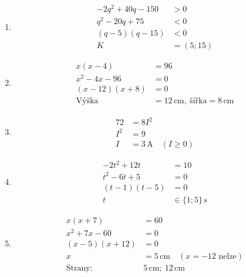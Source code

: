 \documentclass[11pt,a4paper]{article}
\begin{document}
\begin{zadaniReseniBox}[title={Domácí úkol}]
\begin{enumerate}[label=\alph*),itemsep=2pt]
\[\begin{aligned}
v&=20\,\mathrm{m/s}\quad(v\ge0)
\end{aligned}\]
\item
\[\begin{aligned}
-2q^2+40q-150&>0\\[2pt]
q^2-20q+75&<0\\[2pt]
(q-5)(q-15)&<0\\[2pt]
K&=(5;15)
\end{aligned}\]
\item
\[\begin{aligned}
x(x-4)&=96\\[2pt]
x^2-4x-96&=0\\[2pt]
(x-12)(x+8)&=0\\[2pt]
\text{Výška}&=12\,\mathrm{cm},\ \text{šířka}=8\,\mathrm{cm}
\end{aligned}\]
\item
\[\begin{aligned}
72&=8I^2\\[2pt]
I^2&=9\\[2pt]
I&=3\,\mathrm A\quad(I\ge0)
\end{aligned}\]
\item
\[\begin{aligned}
-2t^2+12t&=10\\[2pt]
t^2-6t+5&=0\\[2pt]
(t-1)(t-5)&=0\\[2pt]
t&\in\{1;5\}\,\mathrm s
\end{aligned}\]
\item
\[\begin{aligned}
x(x+7)&=60\\[2pt]
x^2+7x-60&=0\\[2pt]
(x-5)(x+12)&=0\\[2pt]
x&=5\,\mathrm{cm}\quad (x=-12\text{ nelze})\\[2pt]
\text{Strany: }&5\,\mathrm{cm};\ 12\,\mathrm{cm}
\end{aligned}\]
\end{enumerate}
\end{zadaniReseniBox}
\end{document}
